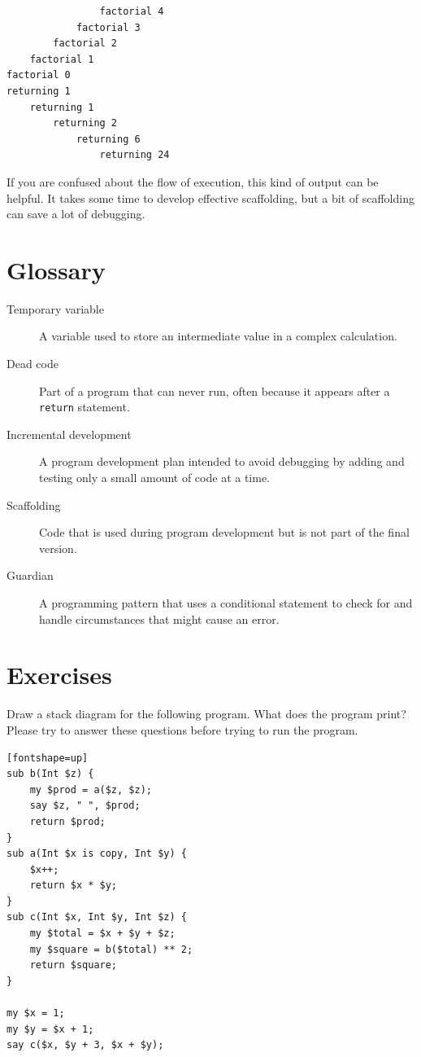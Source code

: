 \begin{verbatim}
                factorial 4
            factorial 3
        factorial 2
    factorial 1
factorial 0
returning 1
    returning 1
        returning 2
            returning 6
                returning 24
\end{verbatim}
%
If you are confused about the flow of execution, this kind of
output can be helpful.  It takes some time to develop effective
scaffolding, but a bit of scaffolding can save a lot of debugging.


\section{Glossary}

\begin{description}

\item[Temporary variable]  A variable used to store an intermediate value in
a complex calculation.

\item[Dead code]  Part of a program that can never run, often because
it appears after a {\tt return} statement.

\item[Incremental development]  A program development plan intended to
avoid debugging by adding and testing only
a small amount of code at a time.

\item[Scaffolding]  Code that is used during program development but is
not part of the final version.

\item[Guardian]  A programming pattern that uses a conditional
statement to check for and handle circumstances that
might cause an error.

\end{description}


\section{Exercises}

\begin{exercise}

Draw a stack diagram for the following program.  What does 
the program print? Please try to answer these questions before 
trying to run the program.

\begin{verbatim}[fontshape=up]
sub b(Int $z) {
    my $prod = a($z, $z);
    say $z, " ", $prod;
    return $prod;
}
sub a(Int $x is copy, Int $y) {
    $x++;
    return $x * $y;
}
sub c(Int $x, Int $y, Int $z) {
    my $total = $x + $y + $z;
    my $square = b($total) ** 2;
    return $square;
}

my $x = 1;
my $y = $x + 1;
say c($x, $y + 3, $x + $y);
\end{verbatim}

\end{exercise}


